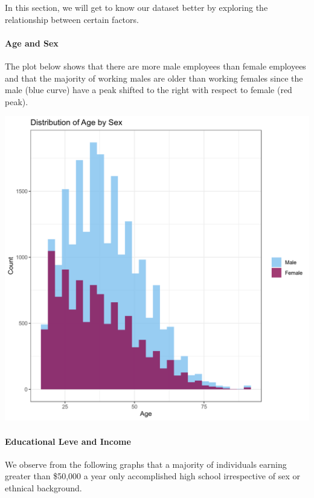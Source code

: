 \documentclass[]{article}
\let\oldparagraph\paragraph
\renewcommand{\paragraph}[1]{\oldparagraph{#1}\mbox{}}
\begin{document}
In this section, we will get to know our dataset better by exploring the
relationship between certain factors.

\hypertarget{age-and-sex}{%
\paragraph{Age and Sex}\label{age-and-sex}}

The plot below shows that there are more male employees than female
employees and that the majority of working males are older than working
females since the male (blue curve) have a peak shifted to the right
with respect to female (red peak).

\includegraphics{../images/Plot_1_Distribution_of_Age_by_Sex.png}

\hypertarget{educational-leve-and-income}{%
\paragraph{Educational Leve and
Income}\label{educational-leve-and-income}}

We observe from the following graphs that a majority of individuals
earning greater than \$50,000 a year only accomplished high school
irrespective of sex or ethnical background.
\end{document}

